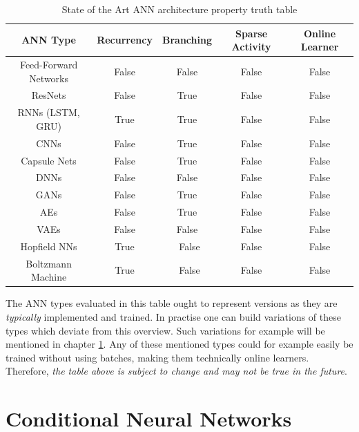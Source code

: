 \begin{table}[h] 
\centering
 \begin{tabular}{||c | c c c c||} 
 \hline
 \acs{ANN} Type & Recurrency & Branching & Sparse Activity & Online Learner \\ [0.5ex] 
 \hline\hline
 Feed-Forward Networks & False & False & False & False \\ 
 \hline
 ResNets & False & True & False & False \\
 \hline
 RNNs (LSTM, GRU) & True & True & False & False \\  
 \hline
  CNNs & False & True & False & False \\  
\hline
  Capsule Nets & False & True & False & False \\  
 \hline
  DNNs & False & False & False & False \\  
 \hline
  GANs & False & True & False & False \\  
 \hline
  AEs & False & True & False & False \\  
 \hline
  VAEs & False & False & False & False \\  
 \hline
  Hopfield NNs & True & ~False & False & False \\  
 \hline
  Boltzmann Machine & True & ~False & False & False \\  
 \hline
\end{tabular}
\caption{State of the Art \acs{ANN} architecture property truth table}   
\end{table} 

The \acs{ANN} types evaluated in this table 
ought to represent versions as they are \textit{typically}
implemented and trained.
In practise one can build variations of these types
which deviate from this overview. 
Such variations for example will be mentioned in chapter \ref{chap_conditional-NNs}.
Any of these mentioned types could for example easily 
be trained without using batches, making them technically
online learners. 
Therefore, \textit{the table above is subject
to change and may not be true in the future}.





 
\clearpage


\chapter{Conditional Neural Networks}\label{chap_conditional-NNs}

